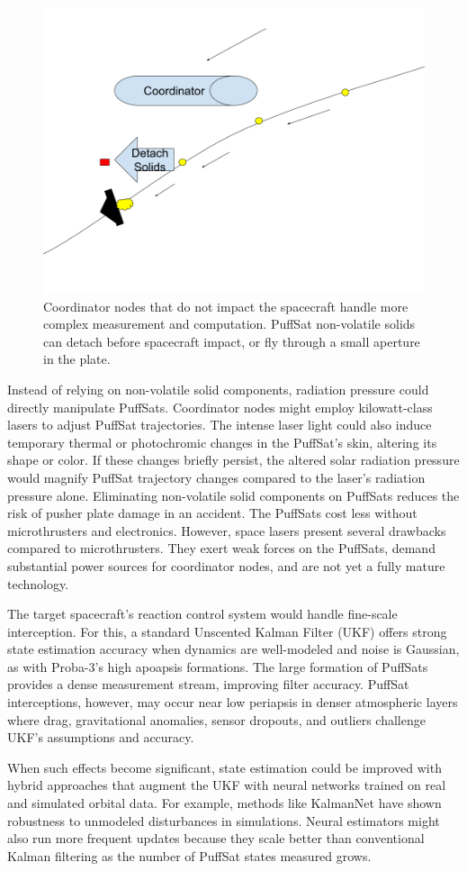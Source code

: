 \documentclass{article}
\begin{document}
\begin{figure}[htpb]
    \centering
    \includegraphics[width=0.5\linewidth]{images/Coordinator Nodes.png}
    \caption{Coordinator nodes that do not impact the spacecraft handle more complex measurement and computation.  PuffSat non-volatile solids can detach before spacecraft impact, or fly through a small aperture in the plate.}
    \label{fig:coordinator-nodes}
\end{figure}

Instead of relying on non-volatile solid components, radiation pressure could directly manipulate PuffSats. Coordinator nodes might employ kilowatt-class lasers to adjust PuffSat trajectories. The intense laser light could also induce temporary thermal or photochromic changes in the PuffSat's skin, altering its shape or color. If these changes briefly persist, the altered solar radiation pressure would magnify PuffSat trajectory changes compared to the laser's radiation pressure alone. Eliminating non-volatile solid components on PuffSats  reduces the risk of pusher plate damage in an accident.  The PuffSats cost less without microthrusters and electronics. However, space lasers present several drawbacks compared to microthrusters. They exert weak forces on the PuffSats, demand substantial power sources for coordinator nodes, and are not yet a fully mature technology.  

The target spacecraft’s reaction control system would handle fine-scale interception. For this, a standard Unscented Kalman Filter (UKF) \cite{wan2000unscented} offers strong state estimation accuracy when dynamics are well-modeled and noise is Gaussian, as with Proba-3's high apoapsis formations. The large formation of PuffSats provides a dense measurement stream, improving filter accuracy.  PuffSat interceptions, however, may occur near low periapsis in denser atmospheric layers where drag, gravitational anomalies, sensor dropouts, and outliers challenge UKF's assumptions and accuracy.

When such effects become significant, state estimation could be improved with hybrid approaches that augment the UKF with neural networks trained on real and simulated orbital data.  For example, methods like KalmanNet \cite{revach_2022_kalmannet} have shown robustness to unmodeled disturbances in simulations.  Neural estimators might also run more frequent updates because they scale better than conventional Kalman filtering as the number of PuffSat states measured grows.
\end{document}
